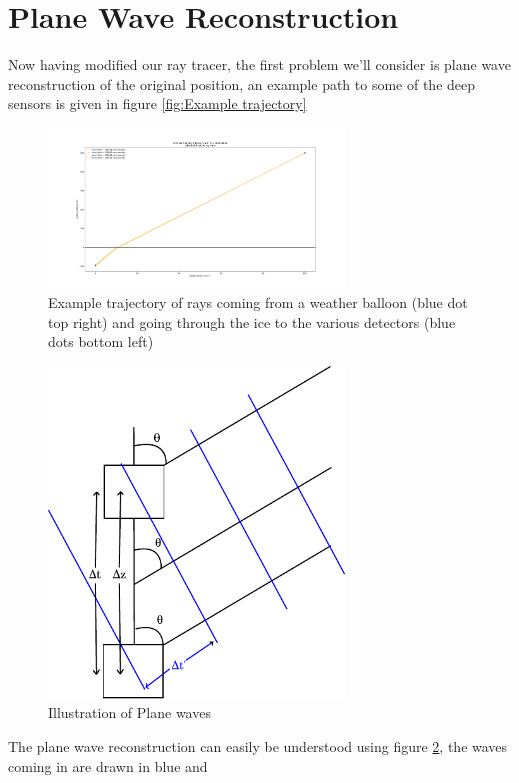 \documentclass[11pt,a4paper,faculty=we,language=en,doctype=report]{cls/ugent-doc}
\begin{document}
\section{Plane Wave Reconstruction}
Now having modified our ray tracer, the first problem we'll consider is
plane wave reconstruction of the original position, an example path
to some of the deep sensors is given in figure \ref{fig:Example
trajectory}
\begin{figure}
	\centering
	\includegraphics[width=0.7\textwidth]{weerballontraject.pdf}
	\caption{Example trajectory of rays coming from a weather balloon (blue dot top right) and going through the ice to the various detectors (blue dots bottom left)}
	\label{fig:Example trajectory}
\end{figure}
\begin{figure}
	\centering
	\includegraphics[width=0.7\textwidth]{planewave.pdf}
	\caption{Illustration of Plane waves}	
	\label{fig:Plane Wave}
\end{figure}
The plane wave reconstruction can easily be understood using figure
\ref{fig:Plane Wave}, the waves coming in are drawn in blue and
\end{document}
